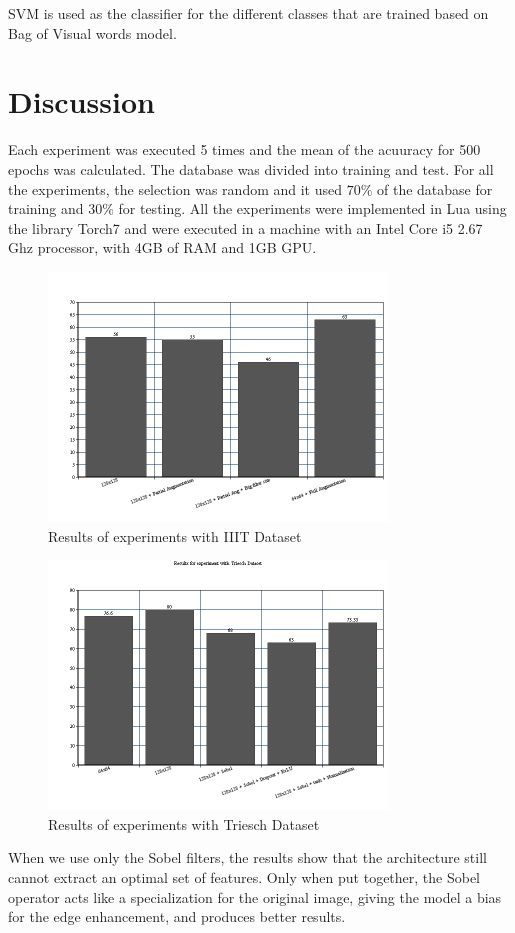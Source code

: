 \documentclass[conference]{IEEEtran}
\begin{document}
SVM is used as the classifier for the different classes that are trained based on Bag of Visual words model.

\section{Discussion}
Each experiment was executed 5 times and the mean of the acuuracy for 500
epochs was calculated. The database was divided into training and test. For all 
the experiments, the selection was random and it used $70\%$ of
the database for training and $30\%$ for testing. All the experiments were implemented 
in Lua using the library Torch7 and were executed in a machine with an 
Intel Core i5 2.67 Ghz processor, with 4GB of RAM and 1GB GPU.

\begin{figure}[h]
\includegraphics[width=9cm]{iiitbars}
\caption{Results of experiments with IIIT Dataset}
\end{figure}

\begin{figure}[h]
\includegraphics[width=9cm]{trieschbars}
\caption{Results of experiments with Triesch Dataset}
\end{figure}

When we use only the Sobel filters, the results show that the architecture
still cannot extract an optimal set of features. Only when put together, the Sobel
operator acts like a specialization for the original image, giving the model a bias
for the edge enhancement, and produces better results.
\end{document}
